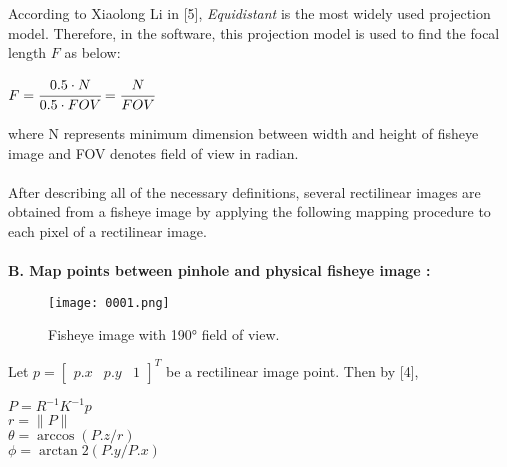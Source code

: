 \documentclass{article}
\begin{document}
According to Xiaolong Li in [5], \textit{Equidistant} is the most widely used projection model. Therefore, in the software, this projection model is used to find the focal length $F$ as below: 
\begin{center}
    $F = \cfrac{0.5 \cdot N}{0.5 \cdot FOV} = \cfrac{N}{FOV} $ 
\end{center}
where N represents minimum dimension between width and height of fisheye image and FOV denotes field of view in radian. \\~\\
After describing all of the necessary definitions, several rectilinear images are obtained from a fisheye image by applying the following mapping procedure to each pixel of a rectilinear image.\\~\\
\textbf{B. Map points between pinhole and physical fisheye image :}
\ \\

\begin{wrapfigure}{r}{0.25\textwidth}
    \centering
    \texttt{[image: 0001.png]}
	\caption{Fisheye image with \ang{190} field of view.}
\end{wrapfigure}
Let \begin{math}
    p = \begin{bmatrix}
		 	p.x & p.y &1
		\end{bmatrix}^{T}
\end{math} be a rectilinear image point. Then by [4], 
\begin{center}
    $P = R^{-1} K^{-1} p$\\
    $r = \|P\|$\\
    $\theta = \arccos(P.z / r)$\\
    $\phi = \arctan2(P.y / P.x)$\\
\end{center}
\end{document}
